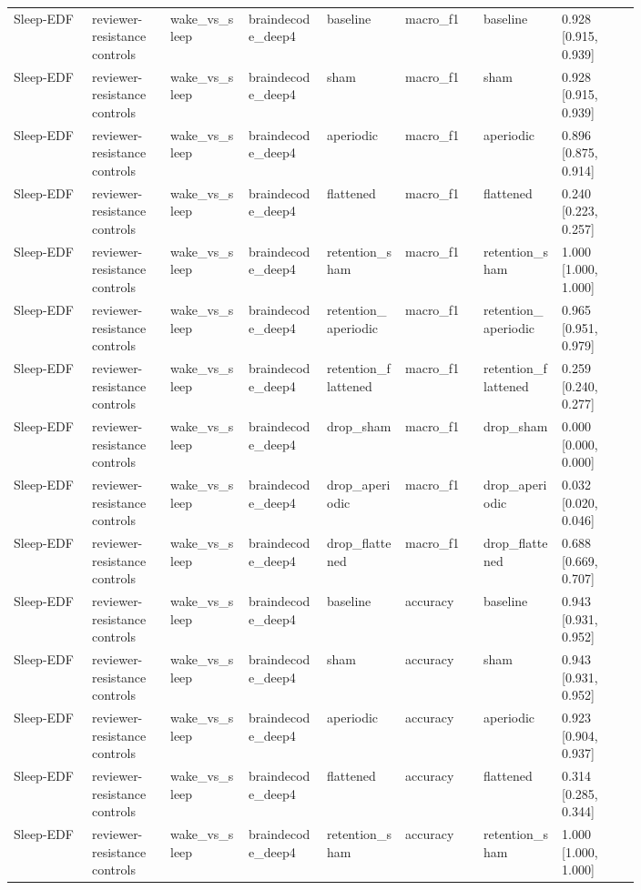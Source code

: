 \begin{longtable}{p{0.10\linewidth}p{0.10\linewidth}p{0.10\linewidth}p{0.10\linewidth}p{0.10\linewidth}p{0.10\linewidth}p{0.10\linewidth}p{0.10\linewidth}}
Sleep-EDF & reviewer-resistance controls & wake\_vs\_sleep & braindecode\_deep4 & baseline & macro\_f1 & baseline & 0.928 [0.915, 0.939]\\
Sleep-EDF & reviewer-resistance controls & wake\_vs\_sleep & braindecode\_deep4 & sham & macro\_f1 & sham & 0.928 [0.915, 0.939]\\
Sleep-EDF & reviewer-resistance controls & wake\_vs\_sleep & braindecode\_deep4 & aperiodic & macro\_f1 & aperiodic & 0.896 [0.875, 0.914]\\
Sleep-EDF & reviewer-resistance controls & wake\_vs\_sleep & braindecode\_deep4 & flattened & macro\_f1 & flattened & 0.240 [0.223, 0.257]\\
Sleep-EDF & reviewer-resistance controls & wake\_vs\_sleep & braindecode\_deep4 & retention\_sham & macro\_f1 & retention\_sham & 1.000 [1.000, 1.000]\\
Sleep-EDF & reviewer-resistance controls & wake\_vs\_sleep & braindecode\_deep4 & retention\_aperiodic & macro\_f1 & retention\_aperiodic & 0.965 [0.951, 0.979]\\
Sleep-EDF & reviewer-resistance controls & wake\_vs\_sleep & braindecode\_deep4 & retention\_flattened & macro\_f1 & retention\_flattened & 0.259 [0.240, 0.277]\\
Sleep-EDF & reviewer-resistance controls & wake\_vs\_sleep & braindecode\_deep4 & drop\_sham & macro\_f1 & drop\_sham & 0.000 [0.000, 0.000]\\
Sleep-EDF & reviewer-resistance controls & wake\_vs\_sleep & braindecode\_deep4 & drop\_aperiodic & macro\_f1 & drop\_aperiodic & 0.032 [0.020, 0.046]\\
Sleep-EDF & reviewer-resistance controls & wake\_vs\_sleep & braindecode\_deep4 & drop\_flattened & macro\_f1 & drop\_flattened & 0.688 [0.669, 0.707]\\
Sleep-EDF & reviewer-resistance controls & wake\_vs\_sleep & braindecode\_deep4 & baseline & accuracy & baseline & 0.943 [0.931, 0.952]\\
Sleep-EDF & reviewer-resistance controls & wake\_vs\_sleep & braindecode\_deep4 & sham & accuracy & sham & 0.943 [0.931, 0.952]\\
Sleep-EDF & reviewer-resistance controls & wake\_vs\_sleep & braindecode\_deep4 & aperiodic & accuracy & aperiodic & 0.923 [0.904, 0.937]\\
Sleep-EDF & reviewer-resistance controls & wake\_vs\_sleep & braindecode\_deep4 & flattened & accuracy & flattened & 0.314 [0.285, 0.344]\\
Sleep-EDF & reviewer-resistance controls & wake\_vs\_sleep & braindecode\_deep4 & retention\_sham & accuracy & retention\_sham & 1.000 [1.000, 1.000]\\

\end{longtable}
